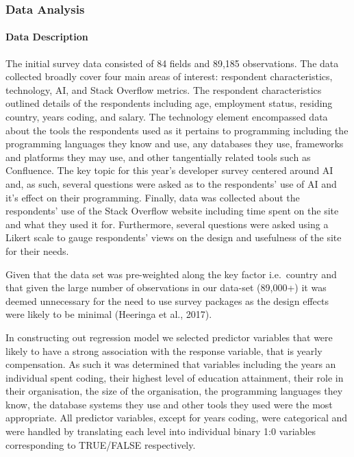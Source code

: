 \documentclass[
  12pt,
]{article}
\begin{document}
\hypertarget{data-analysis}{%
\subsubsection{Data Analysis}\label{data-analysis}}

\hypertarget{data-description-1}{%
\paragraph{Data Description}\label{data-description-1}}

The initial survey data consisted of 84 fields and 89,185 observations.
The data collected broadly cover four main areas of interest: respondent
characteristics, technology, AI, and Stack Overflow metrics. The
respondent characteristics outlined details of the respondents including
age, employment status, residing country, years coding, and salary. The
technology element encompassed data about the tools the respondents used
as it pertains to programming including the programming languages they
know and use, any databases they use, frameworks and platforms they may
use, and other tangentially related tools such as Confluence. The key
topic for this year's developer survey centered around AI and, as such,
several questions were asked as to the respondents' use of AI and it's
effect on their programming. Finally, data was collected about the
respondents' use of the Stack Overflow website including time spent on
the site and what they used it for. Furthermore, several questions were
asked using a Likert scale to gauge respondents' views on the design and
usefulness of the site for their needs.

Given that the data set was pre-weighted along the key factor
i.e.~country and that given the large number of observations in our
data-set (89,000+) it was deemed unnecessary for the need to use survey
packages as the design effects were likely to be minimal (Heeringa et
al., 2017).

In constructing out regression model we selected predictor variables
that were likely to have a strong association with the response
variable, that is yearly compensation. As such it was determined that
variables including the years an individual spent coding, their highest
level of education attainment, their role in their organisation, the
size of the organisation, the programming languages they know, the
database systems they use and other tools they used were the most
appropriate. All predictor variables, except for years coding, were
categorical and were handled by translating each level into individual
binary 1:0 variables corresponding to TRUE/FALSE respectively.
\end{document}
